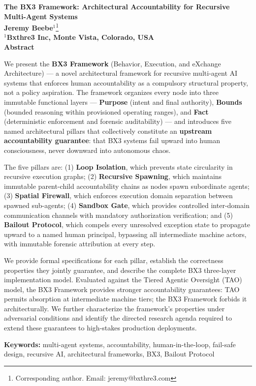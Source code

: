 \thispagestyle{empty}
\vspace*{2cm}

\begin{center}
\textbf{\LARGE The BX3 Framework: Architectural Accountability for Recursive Multi-Agent Systems}\\[1.5em]

\textbf{Jeremy Beebe}$^{1}$\footnote{Corresponding author. Email: jeremy@bxthre3.com} \\[0.6em]
\textbf{$^{1}$Bxthre3 Inc, Monte Vista, Colorado, USA}\\[2em]

\textbf{Abstract}\\[0.5em]
\end{center}

\noindent
We present the \textbf{BX3 Framework} (Behavior, Execution, and eXchange Architecture) ---
a novel architectural framework for recursive multi-agent AI systems that enforces
human accountability as a compulsory structural property, not a policy aspiration.
The framework organizes every node into three immutable functional layers ---
\textbf{Purpose} (intent and final authority), \textbf{Bounds} (bounded reasoning within
provisioned operating ranges), and \textbf{Fact} (deterministic enforcement and forensic
auditability) --- and introduces five named architectural pillars that collectively
constitute an \textbf{upstream accountability guarantee}: that BX3 systems
fail upward into human consciousness, never downward into autonomous chaos.

The five pillars are: (1) \textbf{Loop Isolation}, which prevents state circularity
in recursive execution graphs; (2) \textbf{Recursive Spawning}, which maintains immutable
parent-child accountability chains as nodes spawn subordinate agents; (3)
\textbf{Spatial Firewall}, which enforces execution domain separation between spawned
sub-agents; (4) \textbf{Sandbox Gate}, which provides controlled inter-domain
communication channels with mandatory authorization verification; and
(5) \textbf{Bailout Protocol}, which compels every unresolved exception state to
propagate upward to a named human principal, bypassing all intermediate machine
actors, with immutable forensic attribution at every step.

We provide formal specifications for each pillar, establish the correctness
properties they jointly guarantee, and describe the complete BX3 three-layer
implementation model.  Evaluated against the Tiered Agentic Oversight (TAO) model,
the BX3 Framework provides stronger accountability guarantees: TAO permits
absorption at intermediate machine tiers; the BX3 Framework forbids it
architecturally.  We further characterize the framework's properties under
adversarial conditions and identify the directed research agenda required to
extend these guarantees to high-stakes production deployments.

\noindent\textbf{Keywords:} multi-agent systems, accountability, human-in-the-loop,
fail-safe design, recursive AI, architectural frameworks, BX3, Bailout Protocol

\newpage
\tableofcontents
\newpage